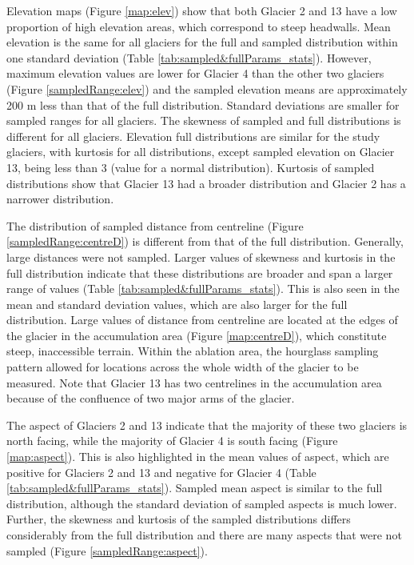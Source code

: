 \documentclass{sfuthesis}
\begin{document}
Elevation maps (Figure \ref{map:elev}) show that both Glacier 2 and 13 have a low proportion of high elevation areas, which correspond to steep headwalls. Mean elevation is the same for all glaciers for the full and sampled distribution within one standard deviation (Table \ref{tab:sampled&fullParams_stats}). However, maximum elevation values are lower for Glacier 4 than the other two glaciers (Figure \ref{sampledRange:elev}) and the sampled elevation means are approximately 200 m less than that of the full distribution. Standard deviations are smaller for sampled ranges for all glaciers. The skewness of sampled and full distributions is different for all glaciers. Elevation full distributions are similar for the study glaciers, with kurtosis for all distributions, except sampled elevation on Glacier 13, being less than 3 (value for a normal distribution). Kurtosis of sampled distributions show that Glacier 13 had a broader distribution and Glacier 2 has a narrower distribution. 

The distribution of sampled distance from centreline (Figure \ref{sampledRange:centreD}) is different from that of the full distribution. Generally, large distances were not sampled. Larger values of skewness and kurtosis in the full distribution indicate that these distributions are broader and span a larger range of values (Table \ref{tab:sampled&fullParams_stats}). This is also seen in the mean and standard deviation values, which are also larger for the full distribution. Large values of distance from centreline are located at the edges of the glacier in the accumulation area (Figure \ref{map:centreD}), which constitute steep, inaccessible terrain. Within the ablation area, the hourglass sampling pattern allowed for locations across the whole width of the glacier to be measured. Note that Glacier 13 has two centrelines in the accumulation area because of the confluence of two major arms of the glacier.

The aspect of Glaciers 2 and 13 indicate that the majority of these two glaciers is north facing, while the majority of Glacier 4 is south facing (Figure \ref{map:aspect}). This is also highlighted in the mean values of aspect, which are positive for Glaciers 2 and 13 and negative for Glacier 4 (Table \ref{tab:sampled&fullParams_stats}). Sampled mean aspect is similar to the full distribution, although the standard deviation of sampled aspects is much lower. Further, the skewness and kurtosis of the sampled distributions differs considerably from the full distribution and there are many aspects that were not sampled (Figure \ref{sampledRange:aspect}). 
\end{document}
